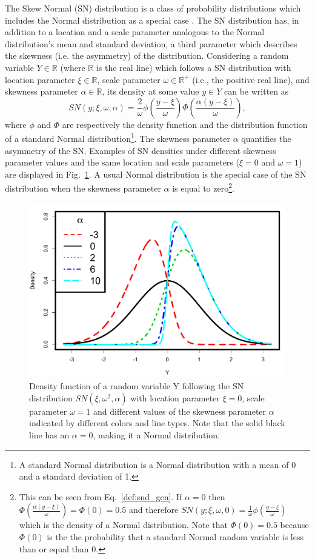 \documentclass[11pt, oneside]{article}
\begin{document}
The Skew Normal (SN) distribution is a class of probability distributions which includes the Normal distribution as a special case \citep{Azzalini1985}. The SN distribution has, in addition to a location and a scale parameter analogous to the Normal distribution's mean and standard deviation, a third parameter which describes the skewness (i.e. the asymmetry) of the distribution. Considering a random variable $Y\in \mathbb R$ (where $\mathbb R$ is the real line) which follows a SN distribution with location parameter $\xi \in \mathbb R$, scale parameter $\omega \in \mathbb R^{+}$ (i.e., the positive real line), and skewness parameter $\alpha \in \mathbb R$, its density at some value $y\in Y$ can be written as 
\begin{equation} \label{def:snd_gen}
SN(y;\xi, \omega, \alpha) = \frac{2}{\omega} \phi\left(\frac{y-\xi}{\omega}\right) \Phi\left(\frac{\alpha(y-\xi)}{\omega}\right),
\end{equation}
where $\phi$ and $\Phi$ are respectively the density function and the distribution function of a standard Normal distribution\footnote{A standard Normal distribution is a Normal distribution with a mean of 0 and a standard deviation of 1.}.
The skewness parameter $\alpha$ quantifies the asymmetry of the SN. 
Examples of SN densities under different skewness parameter values and the same location and scale parameters ($\xi = 0$ and $\omega = 1$) are displayed in Fig.~\ref{fig:SN.plot}.  A usual Normal distribution is the special case of the SN distribution when the skewness parameter $\alpha$ is equal to zero\footnote{This can be seen from Eq.~\ref{def:snd_gen}. If $\alpha = 0$ then $\Phi\left(\frac{\alpha(y-\xi)}{\omega}\right) = \Phi(0) = 0.5$ and therefore $SN(y;\xi, \omega, 0) = \frac{1}{\omega} \phi\left(\frac{y-\xi}{\omega}\right)$ which is the density of a Normal distribution. Note that $\Phi(0) = 0.5$ because $\Phi(0)$ is the the probability that a standard Normal random variable is less than or equal than 0.}.
%
\begin{figure}[htbp]
   \centering
\includegraphics[height = 3in]{Skew_Normal_densities_jjck.pdf} 
   \caption{Density function of a random variable Y following the SN distribution $SN(\xi, \omega^{2}, \alpha)$ with location parameter $\xi = 0$, scale parameter $\omega = 1$ and different values of the skewness parameter $\alpha$ indicated by different colors and line types. Note that the solid black line has an $\alpha = 0$, making it a Normal distribution.}
   \label{fig:SN.plot}
\end{figure}
\end{document}

